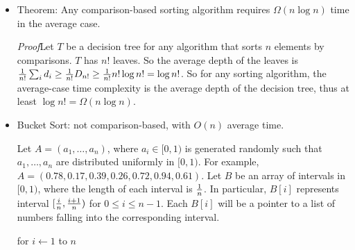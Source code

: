 \documentclass{article}
\begin{document}
\begin{itemize}
{\em Proof}\quad We induct on $m$. When $m=1$, the tree has only one node.
So $D_1=0\ge 1\log 1$. Assume that for any $i\le m-1$, $D_i\ge i\log i$.
Now consider any tree with $m$ leaves. Assume there are $i$ leaves in the
left subtree and $m-i$ leaves in the right subtree. ($i\not=0$ and
$i\not=m$ since each nonleaf has two children.) So 
\begin{eqnarray*}
D_m&=&\min_{1\le i\le m-1}\{D_i+D_{m-i}+m\}\\
&\ge& m+\min_{1\le i\le m-1}\{i\log i+(m-i)\log (m-i)\}
\end{eqnarray*}
Define function $f(x)=x\log x+(m-x)\log (m-x)$.
Then the derivative $f'(x)=x{1\over \ln2}{1\over x}+\log x+(m-x)
{1\over \ln2}{-1\over m-x}-\log (m-x)=\log x-\log(m-x)$.
Let $f'(x)=0$. Then $\log x=\log(m-x)$, which implies $x={m\over2}$.
So $f(x)$ achieves the minimum when $x={m\over2}$. To continue,
\begin{eqnarray*}
D_m&\ge&m+\min_{1\le i\le m-1}\{i\log i+(m-i)\log (m-i)\}\\
&\ge&m+{m\over2}\log{m\over2}+{m\over2}\log{m\over2}\\
&=&m+m\log{m\over2}\\
&=&m\log m
\end{eqnarray*}

\item Theorem: Any comparison-based sorting algorithm requires 
$\Omega(n\log n)$ time in the average case.

{\em Proof}\quad Let $T$ be a decision tree for any algorithm that
sorts $n$ elements by comparisons. $T$ has $n!$ leaves. So the
average depth of the leaves is ${1\over n!}\sum_id_i\ge {1\over n!}D_{n!}
\ge {1\over n!}n!\log n!=\log n!$.
So for any sorting algorithm, the average-case
time complexity is the average depth of the decision tree, thus at least $\log n!
=\Omega(n\log n)$.

\item Bucket Sort: not comparison-based, with $O(n)$ average time.

Let $A=(a_1,\ldots,a_n)$, where $a_i\in[0,1)$ is generated randomly 
such that $a_1,\ldots,a_n$ are distributed uniformly in $[0,1)$.
For example, $A=(0.78,0.17,0.39,0.26,0.72,0.94,0.61)$. 
Let $B$ be an array of intervals in $[0,1)$, where the length of
each interval is $1\over n$. In particular, $B[i]$ represents
interval $[{i\over n},{i+1\over n})$ for $0\le i\le n-1$. Each
$B[i]$ will be a pointer to a list of numbers falling into the
corresponding interval.

\qquad for $i\leftarrow 1$ to $n$ 


\end{itemize}
\end{document}
